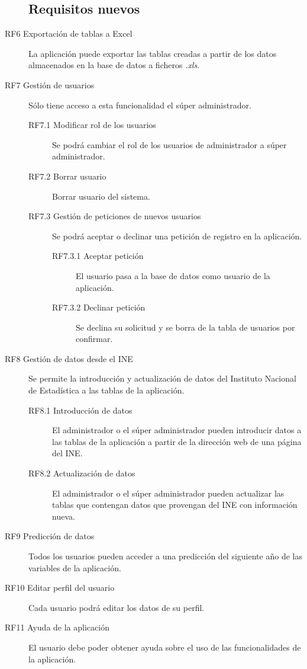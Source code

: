 \begin{description}
    \subsection{Requisitos nuevos}
    \item [RF6 Exportación de tablas a Excel] La aplicación puede exportar las tablas creadas a partir de los datos almacenados en la base de datos a ficheros \textit{.xls}.
    \item[RF7 Gestión de usuarios] Sólo tiene acceso a esta funcionalidad el súper administrador.
    \begin{description}
        \item[RF7.1 Modificar rol de los usuarios] Se podrá cambiar el rol de los usuarios de administrador a súper administrador.
        \item[RF7.2 Borrar usuario] Borrar usuario del sistema.
        \item[RF7.3 Gestión de peticiones de nuevos usuarios] Se podrá aceptar o declinar una petición de registro en la aplicación.
        \begin{description}
            \item[RF7.3.1 Aceptar petición] El usuario pasa a la base de datos como usuario de la aplicación.
            \item[RF7.3.2 Declinar petición] Se declina su solicitud y se borra de la tabla de usuarios por confirmar.
        \end{description}
    \end{description}
    \item[RF8 Gestión de datos desde el INE] Se permite la introducción y actualización de datos del Instituto Nacional de Estadística a las tablas de la aplicación.
    \begin{description}
        \item[RF8.1 Introducción de datos] El administrador o el súper administrador pueden introducir datos a las tablas de la aplicación a partir de la dirección web de una página del INE.
        \item[RF8.2 Actualización de datos] El administrador o el súper administrador pueden actualizar las tablas que contengan datos que provengan del INE con información nueva.
    \end{description}
    \item[RF9 Predicción de datos] Todos los usuarios pueden acceder  a una predicción del siguiente año de las variables de la aplicación.
    \item[RF10 Editar perfil del usuario] Cada usuario podrá editar los datos de su perfil.
    \item[RF11 Ayuda de la aplicación] El usuario debe poder obtener ayuda sobre el uso de las funcionalidades de la aplicación.
\end{description}
